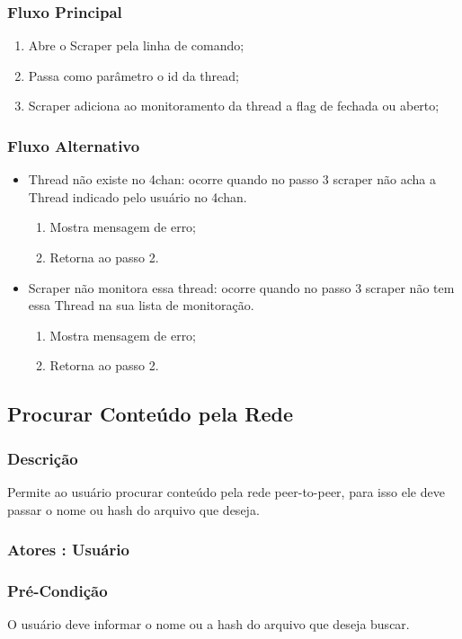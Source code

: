\subsubsection{Fluxo Principal}
\begin{enumerate}
    \item Abre o Scraper pela linha de comando;
    \item Passa como parâmetro o id da thread;
    \item Scraper adiciona ao monitoramento da thread a flag de fechada ou aberto;
\end{enumerate}
\subsubsection{Fluxo Alternativo}
\begin{itemize}
    \item Thread não existe no 4chan: ocorre quando no passo 3 scraper não acha a Thread indicado pelo usuário no 4chan.
    \begin{enumerate}
        \item Mostra mensagem de erro;
        \item Retorna ao passo 2.
    \end{enumerate}
    \item Scraper não monitora essa thread: ocorre quando no passo 3 scraper não tem essa Thread na sua lista de monitoração.
    \begin{enumerate}
        \item Mostra mensagem de erro;
        \item Retorna ao passo 2.
    \end{enumerate}
\end{itemize}


\subsection{Procurar Conteúdo pela Rede}
\subsubsection{Descrição}
Permite ao usuário procurar conteúdo pela rede peer-to-peer, para isso ele deve passar o nome ou hash do arquivo que deseja.
\subsubsection{Atores : Usuário}
\subsubsection{Pré-Condição}
O usuário deve informar o nome ou a hash do arquivo que deseja buscar.
